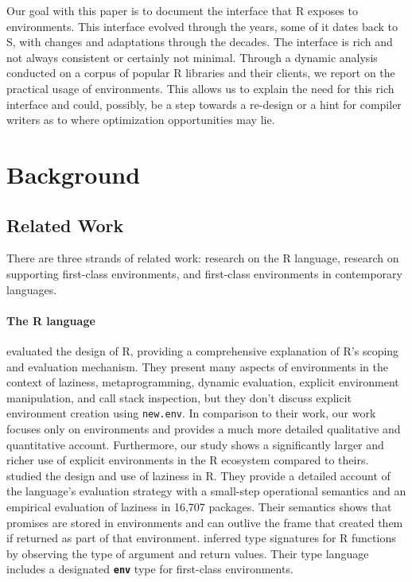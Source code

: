 \documentclass[10pt,review,sigplan,anonymous=true,authorversion=true,nonacm=true]{acmart}
\newcommand{\code}[1]{\lstinline |#1|\xspace}
\begin{document}
Our goal with this paper is to document the interface that R exposes to
environments. This interface evolved through the years, some of it dates back to
S, with changes and adaptations through the decades. The interface is rich and
not always consistent or certainly not minimal. Through a dynamic analysis
conducted on a corpus of popular R libraries and their clients, we report on the
practical usage of environments. This allows us to explain the need for this
rich interface and could, possibly, be a step towards a re-design or a hint for
compiler writers as to where optimization opportunities may lie.

\section{Background}\label{sec:background}

\subsection{Related Work}

There are three strands of related work: research on the R language, research on
supporting first-class environments, and first-class environments in contemporary
languages.

\paragraph{The R language} \citet{ecoop12} evaluated the design of R, providing
a comprehensive explanation of R's scoping and evaluation mechanism. They
present many aspects of environments in the context of laziness,
metaprogramming, dynamic evaluation, explicit environment manipulation, and call
stack inspection, but they don't discuss explicit environment creation using
\code{new.env}. In comparison to their work, our work focuses only on
environments and provides a much more detailed qualitative and quantitative
account. Furthermore, our study shows a significantly larger and richer use of
explicit environments in the R ecosystem compared to theirs. \citet{oopsla19b}
studied the design and use of laziness in R. They provide a detailed account of
the language’s evaluation strategy with a small-step operational semantics and
an empirical evaluation of laziness in 16,707 packages. Their semantics shows
that promises are stored in environments and can outlive the frame that created
them if returned as part of that environment. \cite{oopsla20b} inferred type
signatures for R functions by observing the type of argument and return values.
Their type language includes a designated \textbf{\texttt{env}} type for
first-class environments.
\end{document}

